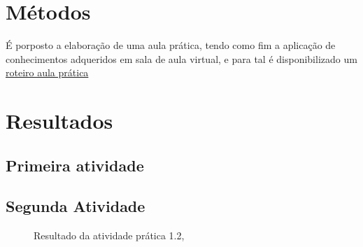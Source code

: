 \section{Métodos}

\par É porposto a elaboração de uma aula prática, tendo como fim a aplicação de conhecimentos adqueridos em sala de aula virtual, e para tal é disponibilizado um \href{https://github.com/ENGENHARIA-DE-SOFTWARE-UNOPAR/NoSQL/blob/main/Roteiro-aula%20pratica.pdf}{roteiro aula prática}



\section{Resultados}
\subsection{Primeira atividade}\label{1atividade}

\subsection{Segunda Atividade}\label{2atividae}



\begin{figure}[H] %
  \center
  \caption{Resultado da atividade prática 1.2, \cite{alguem2022nada}}\label{fig:ap1_cod_vigual1}
\end{figure}

